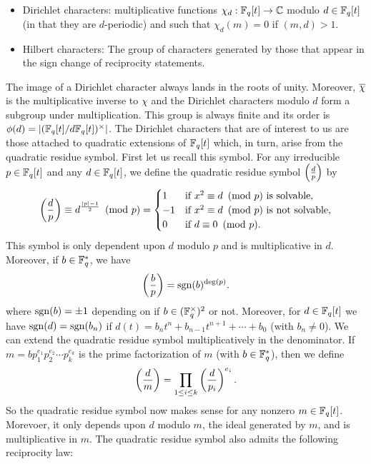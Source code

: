 \documentclass[12pt,reqno,oneside]{amsart}
\begin{document}
    \begin{itemize}
        \item Dirichlet characters: multiplicative functions $\chi_{d}:\mathbb{F}_{q}[t] \to \mathbb{C}$ modulo $d \in \mathbb{F}_{q}[t]$ (in that they are $d$-periodic) and such that $\chi_{d}(m) = 0$ if $(m,d) > 1$.
        \item Hilbert characters: The group of characters generated by those that appear in the sign change of reciprocity statements.
    \end{itemize}
    
    The image of a Dirichlet character always lands in the roots of unity. Moreover, $\overline{\chi}$ is the multiplicative inverse to $\chi$ and the Dirichlet characters modulo $d$ form a subgroup under multiplication. This group is always finite and its order is $\phi(d) = |(\mathbb{F}_{q}[t]/d\mathbb{F}_{q}[t])^{\times}|$. The Dirichlet characters that are of interest to us are those attached to quadratic extensions of $\mathbb{F}_{q}[t]$ which, in turn, arise from the quadratic residue symbol. First let us recall this symbol. For any irreducible $p \in \mathbb{F}_{q}[t]$ and any $d \in \mathbb{F}_{q}[t]$, we define the quadratic residue symbol $\textstyle{\left(\frac{d}{p}\right)}$ by
    \[
        \left(\frac{d}{p}\right) \equiv d^{\frac{|p|-1}{2}} \ \left(\text{mod }p\right) = \begin{cases} 1 & \text{if $x^{2} \equiv d \ \left(\text{mod }p\right)$ is solvable}, \\ -1 & \text{if $x^{2} \equiv d \ \left(\text{mod }p\right)$ is not solvable}, \\ 0 & \text{if $d \equiv 0 \ \left(\text{mod }p\right)$}. \end{cases}
    \]
    This symbol is only dependent upon $d$ modulo $p$ and is multiplicative in $d$. Moreover, if $b \in \mathbb{F}_{q}^{\ast}$, we have
    \[
        \left(\frac{b}{p}\right) = \operatorname{\mathrm{sgn}}(b)^{\deg(p)}.
    \]
    where $\operatorname{\mathrm{sgn}}(b) = \pm1$ depending on if $b \in (\mathbb{F}_{q}^{\times})^{2}$ or not. Moreover, for $d \in \mathbb{F}_{q}[t]$ we have $\operatorname{\mathrm{sgn}}(d) = \operatorname{\mathrm{sgn}}(b_{n})$ if $d(t) = b_{n}t^{n}+b_{n-1}t^{n+1}+\cdots+b_{0}$ (with $b_{n} \neq 0$). We can extend the quadratic residue symbol multiplicatively in the denominator. If $m = bp_{1}^{e_{1}}p_{2}^{e_{2}} \cdots p_{k}^{e_{k}}$ is the prime factorization of $m$ (with $b \in \mathbb{F}_{q}^{\ast}$), then we define
    \[
        \left(\frac{d}{m}\right) = \prod_{1 \le i \le k}\left(\frac{d}{p_{i}}\right)^{e_{i}}.
    \]
    So the quadratic residue symbol now makes sense for any nonzero $m \in \mathbb{F}_{q}[t]$. Morevoer, it only depends upon $d$ modulo $m$, the ideal generated by $m$, and is multiplicative in $m$. The quadratic residue symbol also admits the following reciprocity law:
\end{document}

